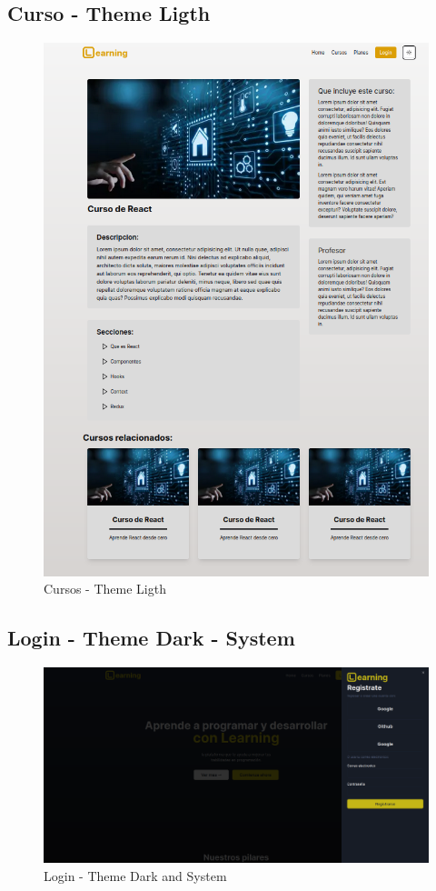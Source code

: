 \subsection{Curso - Theme Ligth}
  \begin{figure}[H]
    \centering
    \includegraphics[width=1.0\textwidth]{img/CU-L.png}
    \caption{Cursos - Theme Ligth}
  \end{figure}
\subsection{Login - Theme Dark - System}
  \begin{figure}[H]
    \centering
    \includegraphics[width=1.0\textwidth]{img/L-DS.png}
    \caption{Login - Theme Dark and System}
  \end{figure}
